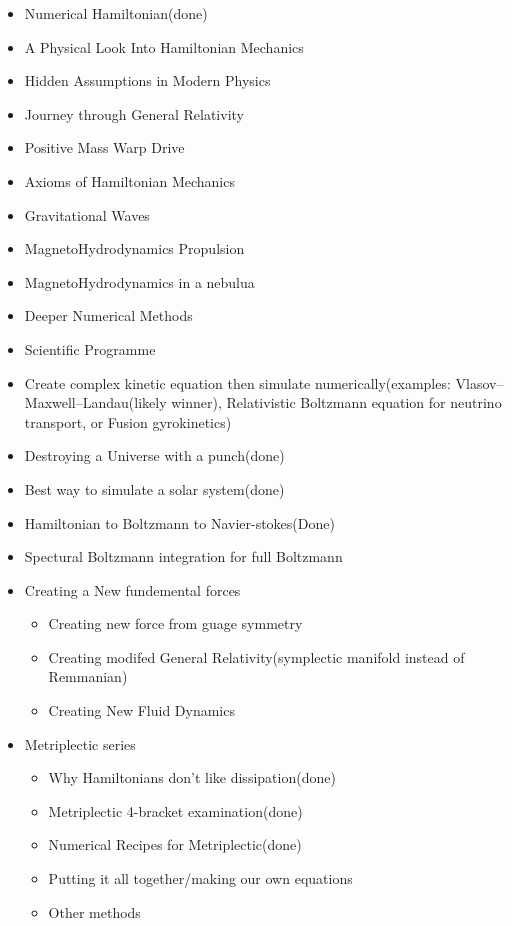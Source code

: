 \begin{itemize}
	\item Numerical Hamiltonian(done)
	\item A Physical Look Into Hamiltonian Mechanics
	\item Hidden Assumptions in Modern Physics
	\item Journey through General Relativity
	\item Positive Mass Warp Drive
	\item Axioms of Hamiltonian Mechanics
	\item Gravitational Waves
	\item MagnetoHydrodynamics Propulsion
	\item MagnetoHydrodynamics in a nebulua
	\item Deeper Numerical Methods
	\item Scientific Programme
  \item Create complex kinetic equation then simulate numerically(examples: Vlasov–Maxwell–Landau(likely winner), 	Relativistic Boltzmann equation for neutrino transport, or Fusion gyrokinetics)
	\item Destroying a Universe with a punch(done)
	\item Best way to simulate a solar system(done)
	\item Hamiltonian to Boltzmann to Navier-stokes(Done)
  \item Spectural Boltzmann integration for full Boltzmann
	\item Creating a New fundemental forces
	      \begin{itemize}
		      \item Creating new force from guage symmetry
		      \item Creating modifed General Relativity(symplectic manifold instead of Remmanian)
		      \item Creating New Fluid Dynamics
	      \end{itemize}
	\item Metriplectic series
	      \begin{itemize}
		      \item Why Hamiltonians don't like dissipation(done)
		      \item Metriplectic 4-bracket examination(done)
		      \item Numerical Recipes for Metriplectic(done)
		      \item Putting it all together/making our own equations
		      \item Other methods

\end{itemize}
\end{itemize}
